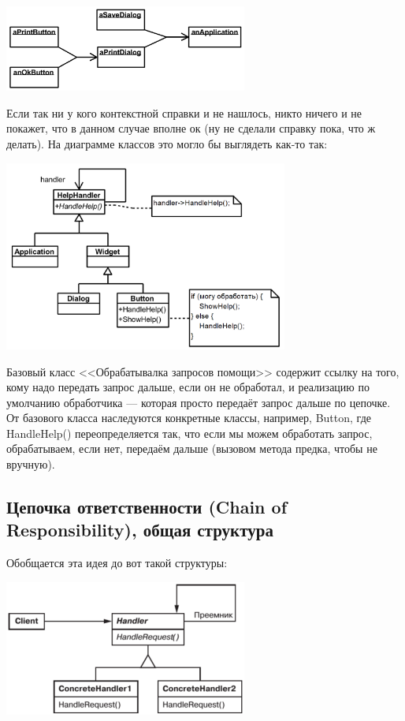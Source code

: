 \documentclass{../text-style}
\begin{document}
\begin{center}
    \includegraphics[width=0.6\textwidth]{chainOfResponsibilityExample.png}
\end{center}

Если так ни у кого контекстной справки и не нашлось, никто ничего и не покажет, что в данном случае вполне ок (ну не сделали справку пока, что ж делать). На диаграмме классов это могло бы выглядеть как-то так:

\begin{center}
    \includegraphics[width=0.7\textwidth]{chainOfResponsibilityExampleClasses.png}
\end{center}

Базовый класс <<Обрабатывалка запросов помощи>> содержит ссылку на того, кому надо передать запрос дальше, если он не обработал, и реализацию по умолчанию обработчика --- которая просто передаёт запрос дальше по цепочке. От базового класса наследуются конкретные классы, например, Button, где HandleHelp() переопределяется так, что если мы можем обработать запрос, обрабатываем, если нет, передаём дальше (вызовом метода предка, чтобы не вручную).

\subsection{Цепочка ответственности (Chain of Responsibility), общая структура}

Обобщается эта идея до вот такой структуры:

\begin{center}
    \includegraphics[width=0.6\textwidth]{chainOfResponsibility.png}
\end{center}
\end{document}
